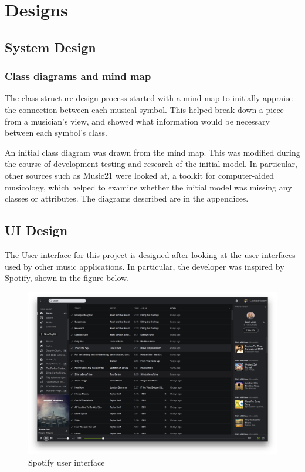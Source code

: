 \section{Designs}
\subsection{System Design}
\subsubsection{Class diagrams and mind map}
The class structure design process started with a mind map to initially appraise the connection between each musical symbol. This helped break down a piece from a musician's view, and showed what information would be necessary between each symbol's class.

An initial class diagram was drawn from the mind map. This was modified during the course of development testing and research of the initial model. In particular, other sources such as Music21 were looked at, a toolkit for computer-aided musicology\parencite{Music21}, which helped to examine whether the initial model was missing any classes or attributes. The diagrams described are in the appendices.
\subsection{UI Design}
The User interface for this project is designed after looking at the user interfaces used by other music applications. In particular, the developer was inspired by Spotify, shown in the figure below.

\begin{figure}[h]
    \centering
    \includegraphics[width=\textwidth]{screen.png}
    \caption{Spotify user interface}
\end{figure}

